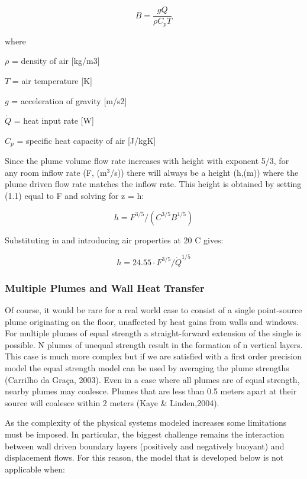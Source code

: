 \begin{equation}
B = \frac{{g\dot Q}}{{\rho {C_p}T}}
\end{equation}

where

\(\rho\) = density of air {[}kg/m3{]}

\(T\) = air temperature {[}K{]}

\(g\) = acceleration of gravity {[}m/s2{]}

\(\dot Q\) = heat input rate {[}W{]}

\({C_p}\) = specific heat capacity of air {[}J/kgK{]}

Since the plume volume flow rate increases with height with exponent 5/3, for any room inflow rate (F, (m\(^{3}\)/s)) there will always be a height (h,(m)) where the plume driven flow rate matches the inflow rate. This height is obtained by setting (1.1) equal to F and solving for z = h:

\begin{equation}
h = {F^{3/5}}/({C^{3/5}}{B^{1/5}})
\end{equation}

Substituting in and introducing air properties at 20 C gives:

\begin{equation}
h = 24.55\cdot {F^{3/5}}/{\dot Q^{1/5}}
\end{equation}

\subsubsection{Multiple Plumes and Wall Heat Transfer}\label{multiple-plumes-and-wall-heat-transfer}

Of course, it would be rare for a real world case to consist of a single point-source plume originating on the floor, unaffected by heat gains from walls and windows. For multiple plumes of equal strength a straight-forward extension of the single is possible. N plumes of unequal strength result in the formation of n vertical layers. This case is much more complex but if we are satisfied with a first order precision model the equal strength model can be used by averaging the plume strengths (Carrilho da Graça, 2003). Even in a case where all plumes are of equal strength, nearby plumes may coalesce. Plumes that are less than 0.5 meters apart at their source will coalesce within 2 meters (Kaye \& Linden,2004).

As the complexity of the physical systems modeled increases some limitations must be imposed. In particular, the biggest challenge remains the interaction between wall driven boundary layers (positively and negatively buoyant) and displacement flows. For this reason, the model that is developed below is not applicable when:

